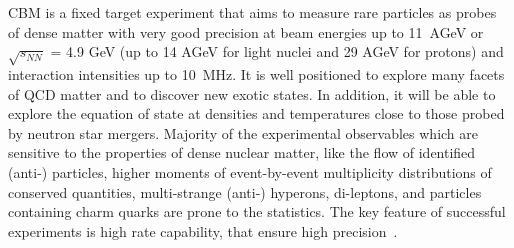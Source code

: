 \gls{CBM} is a fixed target experiment that aims to measure rare particles as probes of dense matter with very good precision at beam energies up to 11~AGeV or $\sqrt{s_{NN}}$ = 4.9 GeV (up to 14 AGeV for light nuclei and 29 AGeV for protons) and interaction intensities up to 10~MHz.
\newpage
It is well positioned to explore many facets of \gls{QCD} matter and to discover new exotic states. In addition, it will be able to explore the equation of state at densities and temperatures close to those probed by neutron star mergers. Majority of the experimental observables which are sensitive to the properties of dense nuclear matter, like the flow of identified (anti-) particles, higher moments of event-by-event multiplicity distributions of conserved quantities, multi-strange (anti-) hyperons, di-leptons, and particles containing charm quarks are prone to the statistics. The key feature of successful experiments is high rate capability, that ensure high precision~\cite{Ablyazimov_2017}. 


